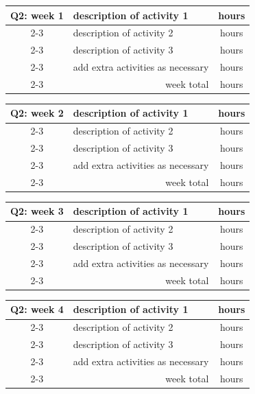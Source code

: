 \documentclass[report,english,cleveref,autoref]{lipics-v2021}
\begin{document}
\begin{tabular}{c| m{10cm}|c}
\hline\hline
Q2: week 1  & description of activity 1 & hours \\
\cline{2-3}
     & description of activity 2 & hours \\
\cline{2-3}
     & description of activity 3 & hours \\
\cline{2-3}
     & add extra activities as necessary & hours \\
\cline{2-3}
     & \multicolumn{1}{r|}{week total} & hours \\
\hline \hline
\end{tabular}
\medskip

\begin{tabular}{c| m{10cm}|c}
\hline\hline
Q2: week 2  & description of activity 1 & hours \\
\cline{2-3}
     & description of activity 2 & hours \\
\cline{2-3}
     & description of activity 3 & hours \\
\cline{2-3}
     & add extra activities as necessary & hours \\
\cline{2-3}
     & \multicolumn{1}{r|}{week total} & hours \\
\hline \hline
\end{tabular}
\medskip

\begin{tabular}{c| m{10cm}|c}
\hline\hline
Q2: week 3  & description of activity 1 & hours \\
\cline{2-3}
     & description of activity 2 & hours \\
\cline{2-3}
     & description of activity 3 & hours \\
\cline{2-3}
     & add extra activities as necessary & hours \\
\cline{2-3}
     & \multicolumn{1}{r|}{week total} & hours \\
\hline \hline
\end{tabular}
\medskip

\begin{tabular}{c| m{10cm}|c}
\hline\hline
Q2: week 4  & description of activity 1 & hours \\
\cline{2-3}
     & description of activity 2 & hours \\
\cline{2-3}
     & description of activity 3 & hours \\
\cline{2-3}
     & add extra activities as necessary & hours \\
\cline{2-3}
     & \multicolumn{1}{r|}{week total} & hours \\
\hline \hline
\end{tabular}
\medskip
\end{document}
